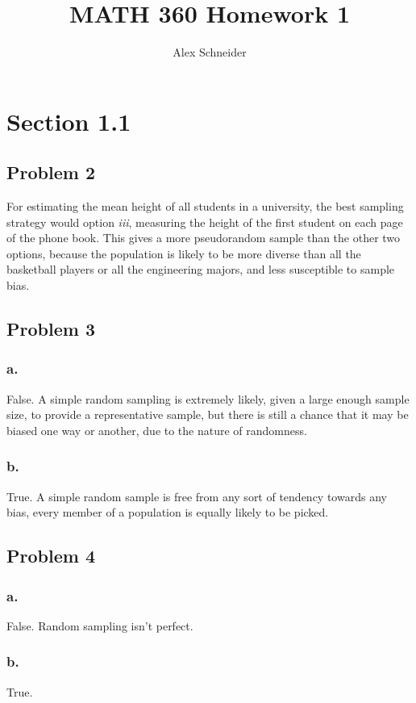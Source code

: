 \documentclass[11pt]{article}
\title{MATH 360 Homework 1}
\author{Alex Schneider}
\begin{document}
\maketitle
\section*{Section 1.1}
\subsection*{Problem 2}
For estimating the mean height of all students in a university, the best
sampling strategy would option \textit{iii}, measuring the height of the first
student on each page of the phone book. This gives a more pseudorandom sample
than the other two options, because the population is likely to be more diverse
than all the basketball players or all the engineering majors, and less
susceptible to sample bias. 

\subsection*{Problem 3}
\subsubsection*{a.}
False. A simple random sampling is extremely likely, given a large enough sample
size, to provide a representative sample, but there is still a chance that it
may be biased one way or another, due to the nature of randomness. 

\subsubsection*{b.}
True. A simple random sample is free from any sort of tendency towards any bias,
every member of a population is equally likely to be picked.

\subsection*{Problem 4}
\subsubsection*{a.}
False. Random sampling isn't perfect.

\subsubsection*{b.}
True.
\end{document}
